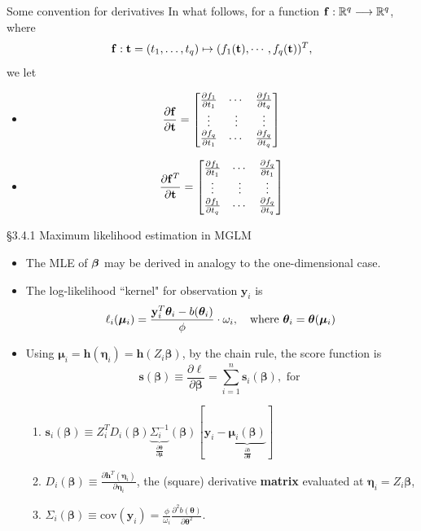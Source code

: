 \documentclass{beamer}
\newcommand{\boldbeta}{{\boldsymbol \beta}}
\newcommand{\boldtheta}{{\boldsymbol \theta}}
\newcommand{\boldmu}{{\boldsymbol \mu}}
\newcommand{\boldeta}{{\boldsymbol \eta}}
\begin{document}
\begin{frame}{Some convention for derivatives}
 In what follows, for a function ${\bf f} :  \mathbb{R}^q\longrightarrow  \mathbb{R}^q$, where 
 \[
 {\bf f}: {\bf t}= (t_1, \dots, t_q)  \mapsto (f_1({\bf t}), \cdots, f_q({\bf t}))^T,
 \]
we let 
\begin{itemize}
\item
\[
\frac{\partial {\bf f}}{\partial {\bf t}} =  
\begin{bmatrix}
\frac{\partial f_1}{\partial t_1} & \cdots & \frac{\partial f_1}{\partial t_q}\\
\vdots & \vdots & \vdots\\
\frac{\partial f_q}{\partial t_1} & \cdots &  \frac{\partial f_q}{\partial t_q}
\end{bmatrix}
\]

\item
\[
\frac{\partial {\bf f}^T}{\partial {\bf t}} =  
\begin{bmatrix}
\frac{\partial f_1}{\partial t_1} & \cdots & \frac{\partial f_q}{\partial t_1}\\
\vdots & \vdots & \vdots\\
\frac{\partial f_1}{\partial t_q} & \cdots &  \frac{\partial f_q}{\partial t_q}
\end{bmatrix}
\]
\end{itemize}

\end{frame}

\begin{frame}{\S3.4.1 Maximum likelihood estimation in MGLM}
\begin{itemize}
\item
The MLE of $\mbox{\boldmath $\beta$}$ may be derived in analogy to the one-dimensional case.
\item
The log-likelihood ``kernel" for observation $\textbf{y}_i$ is
\[
\ell_i(\boldmu_i)=\frac{{\bf y}_i^T\boldtheta_i
-b(\boldtheta_i)}{\phi}\cdot \omega_i, \quad \mbox{where $\boldtheta_i
=\boldtheta(\boldmu_i)$}
\]

\item
Using  $\boldmu_i=\textbf{h}(\boldeta_i)=
\textbf{h}(Z_i\boldbeta)$, by the chain rule, the score function is  
\[
\textbf{s}(\boldbeta)\equiv\frac{\partial\ell}{\partial \boldbeta}=
\sum_{i=1}^n \textbf{s}_i(\boldbeta), \text{ for }
\] 
\begin{enumerate}
\item $\textbf{s}_i(\boldbeta)\equiv Z_i^TD_i(\boldbeta) \underbrace{\Sigma_i^{-1}}_{\frac{\partial \boldtheta}{ \partial \boldmu}}(\boldbeta)
[\textbf{y}_i-  \underbrace{\boldmu_i(\boldbeta)}_{ \frac{\partial b}{\partial \boldtheta}}]$
\item $D_i(\boldbeta)\equiv
\frac{\partial\textbf{h}^T(\boldeta_i)}{\partial \boldeta_i}$,  the
(square) derivative {\bf matrix} 
 evaluated at $\boldeta_i
=Z_i\boldbeta
$, 
\item  $\Sigma_i (\boldbeta)\equiv \text{cov}(\textbf{y}_i) = \frac{\phi}{\omega_i} \frac{\partial^2 b(\boldtheta)}{\partial \boldtheta^2}$.
\end{enumerate}
\end{itemize}
\end{frame}
\end{document}
